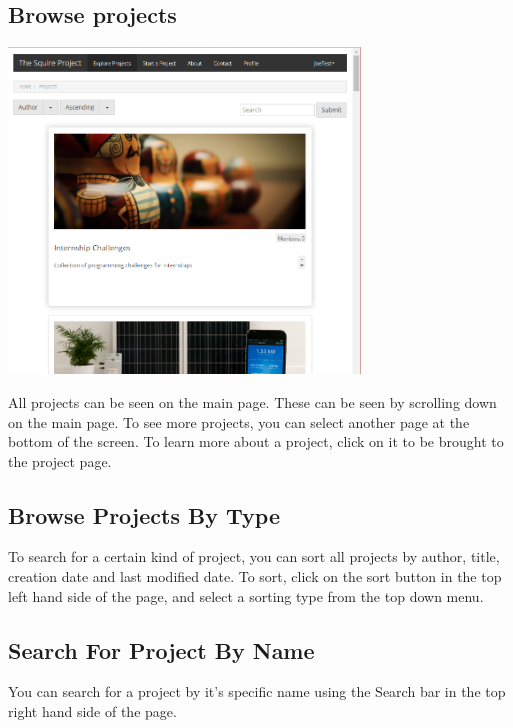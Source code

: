 \documentclass[11pt]{report}
\begin{document}
\subsection{Browse projects}  
	\begin{center}
           \includegraphics[width=0.7\textwidth]{userguide/mainpage}
    \end{center}
    All projects can be seen on the main page. These can be seen by scrolling down on the main page. To see more projects, you can select another page at the bottom of the screen. To learn more about a project, click on it to be brought to the project page.

\subsection{Browse Projects By Type}  
    To search for a certain kind of project, you can sort all projects by author, title, creation date and last modified date. To sort, click on the sort button in the top left hand side of the page, and select a sorting type from the top down menu. 

\subsection{Search For Project By Name}  
    You can search for a project by it's specific name using the Search bar in the top right hand side of the page. 
\end{document}
